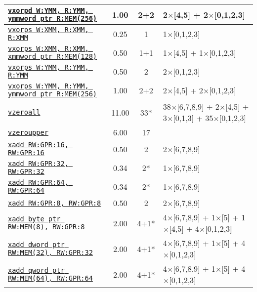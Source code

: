 \documentclass[a4paper,english,fontsize=9]{scrartcl}
\begin{document}
\begin{longtable}{p{}ccL{.25\textwidth}}
  \midrule
  \texttt{\href{https://felixcloutier.com/x86/XORPD.html}{vxorpd W:YMM, R:YMM, ymmword ptr R:MEM(256)}} & 1.00 & 2+2 & 2\(\times\)[4,5] + 2\(\times\)[0,1,2,3] \\
  \midrule
  \texttt{\href{https://felixcloutier.com/x86/XORPS.html}{vxorps W:XMM, R:XMM, R:XMM}} & 0.25 & 1 & 1\(\times\)[0,1,2,3] \\
  \midrule
  \texttt{\href{https://felixcloutier.com/x86/XORPS.html}{vxorps W:XMM, R:XMM, xmmword ptr R:MEM(128)}} & 0.50 & 1+1 & 1\(\times\)[4,5] + 1\(\times\)[0,1,2,3] \\
  \midrule
  \texttt{\href{https://felixcloutier.com/x86/XORPS.html}{vxorps W:YMM, R:YMM, R:YMM}} & 0.50 & 2 & 2\(\times\)[0,1,2,3] \\
  \midrule
  \texttt{\href{https://felixcloutier.com/x86/XORPS.html}{vxorps W:YMM, R:YMM, ymmword ptr R:MEM(256)}} & 1.00 & 2+2 & 2\(\times\)[4,5] + 2\(\times\)[0,1,2,3] \\
  \midrule
  \texttt{\href{https://felixcloutier.com/x86/VZEROALL.html}{vzeroall}} & 11.00 & 33* & 38\(\times\)[6,7,8,9] + 2\(\times\)[4,5] + 3\(\times\)[0,1,3] + 35\(\times\)[0,1,2,3] \\
  \midrule
  \texttt{\href{https://felixcloutier.com/x86/VZEROUPPER.html}{vzeroupper}} & 6.00 & 17 &  \\
  \midrule
  \texttt{\href{https://felixcloutier.com/x86/XADD.html}{xadd RW:GPR:16, RW:GPR:16}} & 0.50 & 2 & 2\(\times\)[6,7,8,9] \\
  \midrule
  \texttt{\href{https://felixcloutier.com/x86/XADD.html}{xadd RW:GPR:32, RW:GPR:32}} & 0.34 & 2* & 1\(\times\)[6,7,8,9] \\
  \midrule
  \texttt{\href{https://felixcloutier.com/x86/XADD.html}{xadd RW:GPR:64, RW:GPR:64}} & 0.34 & 2* & 1\(\times\)[6,7,8,9] \\
  \midrule
  \texttt{\href{https://felixcloutier.com/x86/XADD.html}{xadd RW:GPR:8, RW:GPR:8}} & 0.50 & 2 & 2\(\times\)[6,7,8,9] \\
  \midrule
  \texttt{\href{https://felixcloutier.com/x86/XADD.html}{xadd byte ptr RW:MEM(8), RW:GPR:8}} & 2.00 & 4+1* & 4\(\times\)[6,7,8,9] + 1\(\times\)[5] + 1\(\times\)[4,5] + 4\(\times\)[0,1,2,3] \\
  \midrule
  \texttt{\href{https://felixcloutier.com/x86/XADD.html}{xadd dword ptr RW:MEM(32), RW:GPR:32}} & 2.00 & 4+1* & 4\(\times\)[6,7,8,9] + 1\(\times\)[5] + 4\(\times\)[0,1,2,3] \\
  \midrule
  \texttt{\href{https://felixcloutier.com/x86/XADD.html}{xadd qword ptr RW:MEM(64), RW:GPR:64}} & 2.00 & 4+1* & 4\(\times\)[6,7,8,9] + 1\(\times\)[5] + 4\(\times\)[0,1,2,3] \\

\end{longtable}
\end{document}
